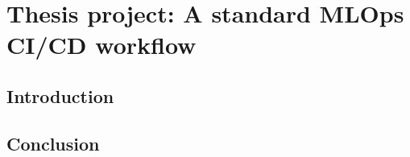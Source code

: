 \chapter{Thesis project: A standard MLOps CI/CD workflow}
\section{Introduction}

\section{Conclusion}